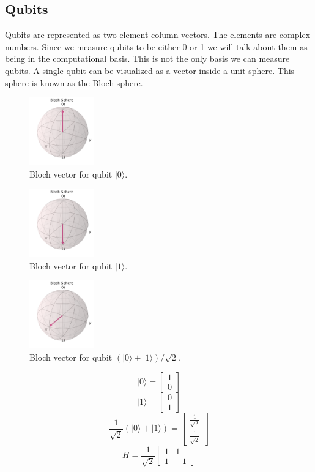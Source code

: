 \documentclass{article}
\newcommand{\ket}[1]{{\lvert #1 \rangle}}
\begin{document}
\subsection{Qubits}

Qubits are represented as two element column vectors. The elements are complex numbers. Since we measure qubits to be either 0 or 1 we will talk about them as being in the computational basis. This is not the only basis we can measure qubits. A single qubit can be visualized as a vector inside a unit sphere. This sphere is known as the Bloch sphere. 

\begin{figure}[H]
    \centering
    \includegraphics[width=0.25\textwidth]{bloch0.png}
    \caption{Bloch vector for qubit $\ket{0}$.}
\end{figure}

\begin{figure}[H]
    \centering
    \includegraphics[width=0.25\textwidth]{bloch1.png}
    \caption{Bloch vector for qubit $\ket{1}$.}
\end{figure}

\begin{figure}[H]
    \centering
    \includegraphics[width=0.25\textwidth]{superpos.png}
    \caption{Bloch vector for qubit $(\ket{0}+\ket{1})/\sqrt{2}$.}
\end{figure}

$$
\ket{0} = 
\begin{bmatrix}
1 \\
0
\end{bmatrix}
$$
$$
\ket{1} =
\begin{bmatrix}
0 \\
1
\end{bmatrix}
$$
$$
\frac{1}{\sqrt{2}}(\ket{0}+\ket{1}) = 
\begin{bmatrix}
    \frac{1}{\sqrt{2}}\\
    \frac{1}{\sqrt{2}}
\end{bmatrix}
$$
$$
H = \frac{1}{\sqrt{2}}
\begin{bmatrix}
    1 & 1 \\
    1 & -1
\end{bmatrix}
$$
\end{document}
